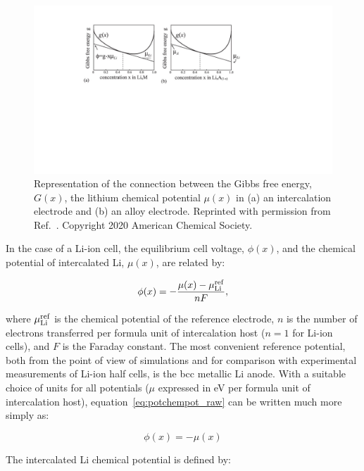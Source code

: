 \documentclass[../main.tex]{subfiles}
\begin{document}
\begin{figure}
    \centering
    \includegraphics[scale=0.8]{figures/thermodynamics_vanderven.pdf}
    \caption{Representation of the connection between the Gibbs free energy, $G(x)$, the  lithium chemical potential $\mu(x)$ in (a) an intercalation electrode and (b) an alloy electrode. Reprinted with permission from Ref.~. Copyright 2020 American Chemical Society.}
    \label{fig:vanderven_thermodynamics}
\end{figure}

In the case of a Li-ion cell, the equilibrium cell voltage, $\phi(x)$, and the chemical potential of intercalated Li, $\mu(x)$, are related by:

\begin{equation}
    \phi(x) = -\frac{\mu(x) - \mu_{\rm{Li}}^{\rm{ref}}}{nF},
    \label{eq:potchempot_raw}
\end{equation}

where $\mu_{\rm{Li}}^{\rm{ref}}$ is the chemical potential of the reference electrode, $n$ is the number of electrons transferred per formula unit of intercalation host ($n =1$ for Li-ion cells), and $F$ is the Faraday constant. The most convenient reference potential, both from the point of view of simulations and for comparison with experimental measurements of Li-ion half cells, is the bcc metallic Li anode. With a suitable choice of units for all potentials ($\mu$ expressed in eV per formula unit of intercalation host), equation~\ref{eq:potchempot_raw} can be written much more simply as:\cite{CEDER1999131}

\begin{equation}
    \phi(x) = -\mu(x)
    \label{eq:potchempot}
\end{equation}

The intercalated Li chemical potential is defined by:
\end{document}
